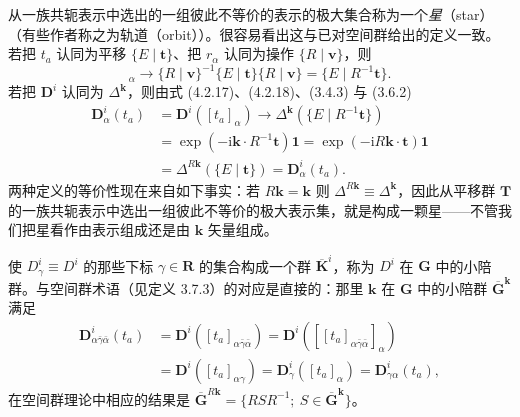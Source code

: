 从一族共轭表示中选出的一组彼此不等价的表示的极大集合称为一个\textit{星}（star）（有些作者称之为轨道（orbit））。很容易看出这与已对空间群给出的定义一致。若把 $t_{a}$ 认同为平移 $\{E \mid \mathbf{t}\}$、把 $r_{\alpha}$ 认同为操作 $\{R \mid \mathbf{v}\}$，则
\begin{equation*}
[t_{a}]_{\alpha} \rightarrow \{R \mid \mathbf{v}\}^{-1}\{E \mid \mathbf{t}\}\{R \mid \mathbf{v}\} = \{E \mid R^{-1}\mathbf{t}\}.
\tag{4.2.18}
\end{equation*}
若把 $\mathbf{D}^{i}$ 认同为 $\Delta^{\mathbf{k}}$，则由式 (4.2.17)、(4.2.18)、(3.4.3) 与 (3.6.2)
\begin{equation*}
\begin{aligned}
\mathbf{D}^{i}_{\alpha}(t_{a}) &= \mathbf{D}^{i}([t_{a}]_{\alpha}) \rightarrow \Delta^{\mathbf{k}}(\{E \mid R^{-1}\mathbf{t}\})\\
&= \exp(-\mathrm{i}\mathbf{k} \cdot R^{-1}\mathbf{t})\mathbf{1} = \exp(-\mathrm{i}R\mathbf{k} \cdot \mathbf{t})\mathbf{1}\\
&= \Delta^{R\mathbf{k}}(\{E \mid \mathbf{t}\}) = \mathbf{D}^{i}_{\alpha}(t_{a}).
\end{aligned}
\tag{4.2.19}
\end{equation*}
两种定义的等价性现在来自如下事实：若 $R\mathbf{k} = \mathbf{k}$ 则 $\Delta^{R\mathbf{k}} \equiv \Delta^{\mathbf{k}}$，因此从平移群 $\mathbf{T}$ 的一族共轭表示中选出一组彼此不等价的极大表示集，就是构成一颗星——不管我们把星看作由表示组成还是由 $\mathbf{k}$ 矢量组成。

使 $D^{i}_{\gamma} \equiv D^{i}$ 的那些下标 $\gamma \in \mathbf{R}$ 的集合构成一个群 $\overline{\mathbf{K}}^{i}$，称为 $D^{i}$ 在 $\mathbf{G}$ 中的小陪群。与空间群术语（见定义 3.7.3）的对应是直接的：那里 $\mathbf{k}$ 在 $\mathbf{G}$ 中的小陪群 $\overline{\mathbf{G}}^{\mathbf{k}}$ 满足
\begin{equation*}
\begin{aligned}
\mathbf{D}^{i}_{\alpha\bar{\gamma}\bar{\alpha}}(t_{a}) &= \mathbf{D}^{i}([t_{a}]_{\alpha\bar{\gamma}\bar{\alpha}}) = \mathbf{D}^{i}\left(\left[[t_{a}]_{\alpha\bar{\gamma}\bar{\alpha}}\right]_{\alpha}\right)\\
&= \mathbf{D}^{i}([t_{a}]_{\alpha\gamma}) = \mathbf{D}^{i}_{\gamma}([t_{a}]_{\alpha}) = \mathbf{D}^{i}_{\gamma\alpha}(t_{a}),
\end{aligned}
\tag{4.2.19a}
\end{equation*}
在空间群理论中相应的结果是 $\overline{\mathbf{G}}^{R\mathbf{k}} = \{RSR^{-1};\ S \in \overline{\mathbf{G}}^{\mathbf{k}}\}$。

